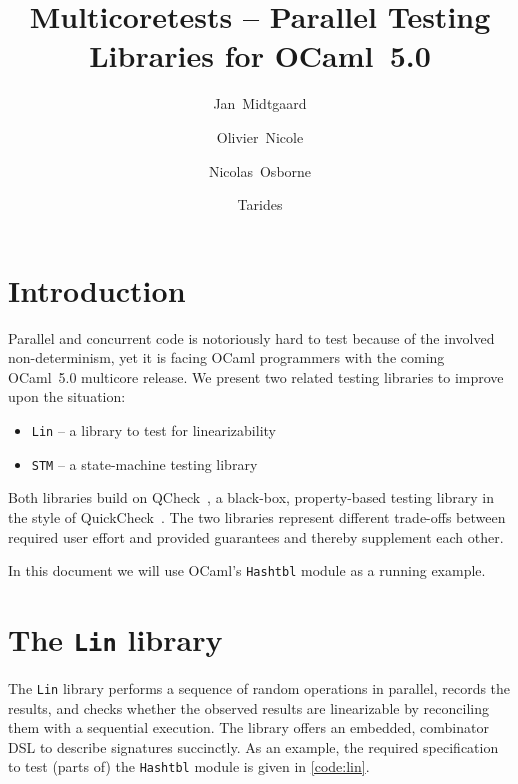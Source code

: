 \documentclass[twocolumn,10pt]{article}
\title{Multicoretests -- Parallel Testing Libraries for OCaml~5.0}
\author{Jan~Midtgaard \and Olivier~Nicole \and Nicolas~Osborne}
\date{Tarides} %
\begin{document}
\maketitle

\section{Introduction}

Parallel and concurrent code is notoriously hard to test because of
the involved non-determinism, yet it is facing OCaml programmers with
the coming OCaml~5.0 multicore release. We present two related testing
libraries to improve upon the situation:
\begin{itemize}
  \tightlist
  \item \texttt{Lin} -- a library to test for linearizability %
  \item \texttt{STM} -- a state-machine testing library
\end{itemize}
Both libraries build on QCheck~\cite{QCheck}, a black-box, property-based
testing library in the style of
QuickCheck~\cite{claessenQuickCheckLightweightTool2000}.
The two libraries represent different trade-offs between required user effort
and provided guarantees and thereby supplement each other.

In this document we will use OCaml's \texttt{Hashtbl} module as a running
example.


\section{The \texttt{Lin} library}

The \texttt{Lin} library performs a sequence of random operations in
parallel, records the results, and checks whether the observed results
are linearizable by reconciling them with a sequential execution.
%
The library offers an embedded, combinator DSL to describe signatures
succinctly. As an example, the required specification to test (parts
of) the \texttt{Hashtbl} module is given in \cref{code:lin}.
\end{document}
